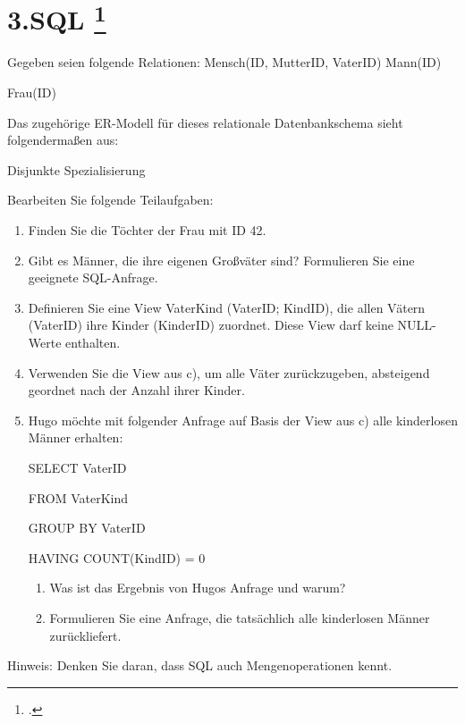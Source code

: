 \documentclass{lehramt-informatik-aufgabe}
\begin{document}
\section{3.SQL
\footcite{66116:2015:09}}

Gegeben seien folgende Relationen:
Mensch(ID, MutterID, VaterID)
Mann(ID)

Frau(ID)

Das zugehörige ER-Modell für dieses relationale Datenbankschema sieht
folgendermaßen aus:

Disjunkte
Spezialisierung

Bearbeiten Sie folgende Teilaufgaben:

\begin{enumerate}


\item Finden Sie die Töchter der Frau mit ID 42.


\item Gibt es Männer, die ihre eigenen Großväter sind? Formulieren Sie eine
geeignete SQL-Anfrage.


\item Definieren Sie eine View VaterKind (VaterID; KindID), die allen
Vätern (VaterID) ihre Kinder (KinderID) zuordnet. Diese View darf keine
NULL-Werte enthalten.


\item Verwenden Sie die View aus c), um alle Väter zurückzugeben,
absteigend geordnet nach der Anzahl ihrer Kinder.


\item Hugo möchte mit folgender Anfrage auf Basis der View aus c) alle
kinderlosen Männer erhalten:

SELECT VaterID

FROM VaterKind

GROUP BY VaterID

HAVING COUNT(KindID) = 0

\begin{enumerate}


\item Was ist das Ergebnis von Hugos Anfrage und warum?


\item Formulieren Sie eine Anfrage, die tatsächlich alle kinderlosen
Männer zurückliefert.

\end{enumerate}

\end{enumerate}

Hinweis: Denken Sie daran, dass SQL auch Mengenoperationen kennt.
\end{document}
